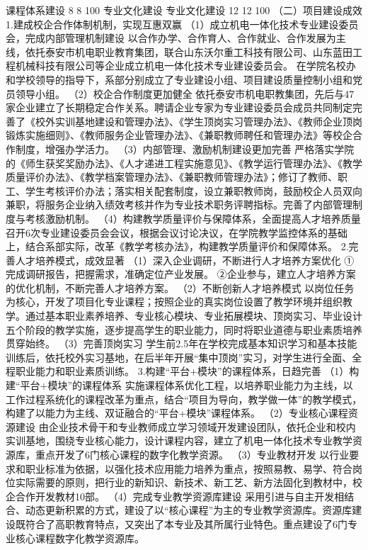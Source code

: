 课程体系建设
8
8
100%
专业文化建设
专业文化建设
12
12
100%
（二）项目建设成效
1.建成校企合作体制机制，实现互惠双赢
（1）成立机电一体化技术专业建设委员会，完成内部管理机制建设
以合作办学、合作育人、合作就业、合作发展为主线，依托泰安市机电职业教育集团，联合山东沃尔重工科技有限公司、山东蓝田工程机械科技有限公司等企业成立机电一体化技术专业建设委员会。
在学院名校办和学校领导的指导下，系部分别成立了专业建设小组、项目建设质量控制小组和党员领导小组。
（2）校企合作制度更加健全
依托泰安市机电职教集团，先后与47家企业建立了长期稳定合作关系。聘请企业专家为专业建设委员会成员共同制定完善了《校外实训基地建设和管理办法》、《学生顶岗实习管理办法》、《教师企业顶岗锻炼实施细则》、《教师服务企业管理办法》、《兼职教师聘任和管理办法》等校企合作制度，增强办学活力。
（3）内部管理、激励机制建设更加完善
严格落实学院的《师生获奖奖励办法》、《人才递进工程实施意见》、《教学运行管理办法》、《教学质量评价办法》、《教学档案管理办法》、《兼职教师管理办法》；修订了教师、职工、学生考核评价办法；落实相关配套制度，设立兼职教师岗，鼓励校企人员双向兼职，将服务企业纳入绩效考核并作为专业技术职务评聘指标。完善了内部管理制度与考核激励机制。
（4）构建教学质量评价与保障体系，全面提高人才培养质量
召开6次专业建设委员会会议，根据会议讨论决议，在学院教学监控体系的基础上，结合系部实际，改革《教学考核办法》，构建教学质量评价和保障体系。
2.完善人才培养模式，成效显著
（1）深入企业调研，不断进行人才培养方案优化
①完成调研报告，把握需求，准确定位产业发展。
②企业参与，建立人才培养方案的优化机制，不断完善人才培养方案。
（2）不断创新人才培养模式
以岗位任务为核心，开发了项目化专业课程；按照企业的真实岗位设置了教学环境并组织教学。通过基本职业素养培养、专业核心模块、专业拓展模块、顶岗实习、毕业设计五个阶段的教学实施，逐步提高学生的职业能力，同时将职业道德与职业素质培养贯穿始终。
 （3）完善顶岗实习
学生前2.5年在学校完成基本知识学习和基本技能训练后，依托校外实习基地，在后半年开展“集中顶岗”实习，对学生进行全面、全程职业能力和职业素质训练。
3.构建“平台+模块”的课程体系，日趋完善
（1）构建“平台+模块”的课程体系
实施课程体系优化工程，以培养职业能力为主线，以工作过程系统化的课程改革为重点，结合“项目为导向，教学做一体”的教学模式，构建了以能力为主线、双证融合的“平台+模块”课程体系。
（2）专业核心课程资源建设
由企业技术骨干和专业教师成立学习领域开发建设团队，依托企业和校内实训基地，围绕专业核心能力，设计课程内容，建立了机电一体化技术专业教学资源库，重点开发了6门核心课程的数字化教学资源。
（3）专业教材开发
以行业要求和职业标准为依据，以强化技术应用能力培养为重点，按照易教、易学、符合岗位实际需要的原则，把行业的新知识、新技术、新工艺、新方法固化到教材中，校企合作开发教材10部。
（4）完成专业教学资源库建设
采用引进与自主开发相结合、动态更新积累的方式，建设了以“核心课程”为主的专业教学资源库。资源库建设既符合了高职教育特点，又突出了本专业及其所属行业特色。重点建设了6门专业核心课程数字化教学资源库。
